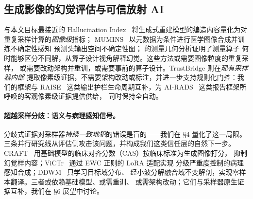 \subsection{生成影像的幻觉评估与可信放射 AI}
与本文目标最接近的 Hallucination Index~\cite{tivnan2024hallucinationindex}
将生成式重建模型的编造内容量化为对重复采样计算的\emph{图像级}指标；
MUMINS~\cite{oliveras2026mumins} 以元数据为条件进行医学图像合成并训练不确定性感知
预测头输出空间不确定性图；\cite{jin2026trustworthy} 的测量几何分析证明了测量算子
何时能够区分不同解，从算子设计视角解释幻觉。这些方法或需要图像粒度的重复采样，
或需要改动架构并重训，或需要事前的算子设计。TrustBridge 则在\emph{现有采样器内部}
提取像素级证据，不需要架构改动或标注，并进一步支持规则化门控：我们的框架与
RAISE~\cite{cardoso2023raise} 这类输出护栏生命周期互补，为
AI-RADS~\cite{russe2026airads} 这类报告框架所呼唤的客观像素级证据提供供给，
同时保持全自动。

\paragraph{超越采样分歧：语义与病理感知信号。}
分歧式证据对采样器\emph{持续一致地犯}的错误是盲的——我们在 \S4 量化了这一局限。
三条并行研究线从评估侧攻击该问题，并构成我们这类信任层的自然下一步。
CRAFT~\cite{chung2026craft} 用基础模型的临床对齐分数（CAS）按临床标准为生成图像打分，
抑制幻觉样内容；ViCTr~\cite{susladkar2025victr} 通过 EWC 正则的 LoRA 适配实现
分级严重度控制的病理感知合成；DDWM~\cite{li2025ddwm} 只学习目标域分布、
经小波分解融合域不变解剖，实现零样本翻译。三者或依赖基础模型、或需重训、
或需架构改动；它们与采样器原生证据互补，我们在 \S6 展望中讨论。


